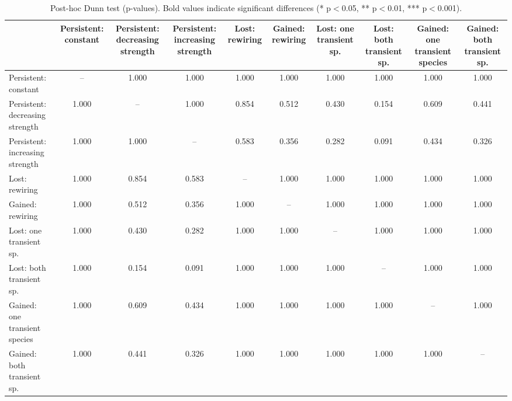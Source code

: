 \begin{table}[ht]
\centering
\begin{tabular}{lccccccccc}
\toprule
 & Persistent:
 constant & Persistent:
 decreasing strength & Persistent:
 increasing strength & Lost:
 rewiring & Gained:
 rewiring & Lost:
 one transient sp. & Lost:
 both transient sp. & Gained:
 one transient species & Gained:
 both transient sp. \\
\midrule
Persistent:
 constant & -- & 1.000 & 1.000 & 1.000 & 1.000 & 1.000 & 1.000 & 1.000 & 1.000 \\
Persistent:
 decreasing strength & 1.000 & -- & 1.000 & 0.854 & 0.512 & 0.430 & 0.154 & 0.609 & 0.441 \\
Persistent:
 increasing strength & 1.000 & 1.000 & -- & 0.583 & 0.356 & 0.282 & 0.091 & 0.434 & 0.326 \\
Lost:
 rewiring & 1.000 & 0.854 & 0.583 & -- & 1.000 & 1.000 & 1.000 & 1.000 & 1.000 \\
Gained:
 rewiring & 1.000 & 0.512 & 0.356 & 1.000 & -- & 1.000 & 1.000 & 1.000 & 1.000 \\
Lost:
 one transient sp. & 1.000 & 0.430 & 0.282 & 1.000 & 1.000 & -- & 1.000 & 1.000 & 1.000 \\
Lost:
 both transient sp. & 1.000 & 0.154 & 0.091 & 1.000 & 1.000 & 1.000 & -- & 1.000 & 1.000 \\
Gained:
 one transient species & 1.000 & 0.609 & 0.434 & 1.000 & 1.000 & 1.000 & 1.000 & -- & 1.000 \\
Gained:
 both transient sp. & 1.000 & 0.441 & 0.326 & 1.000 & 1.000 & 1.000 & 1.000 & 1.000 & -- \\
\bottomrule
\end{tabular}
\caption{Post-hoc Dunn test (p-values). Bold values indicate significant differences (* p$<$0.05, ** p$<$0.01, *** p$<$0.001).}
\label{tab:dunn_posthoc}
\end{table}